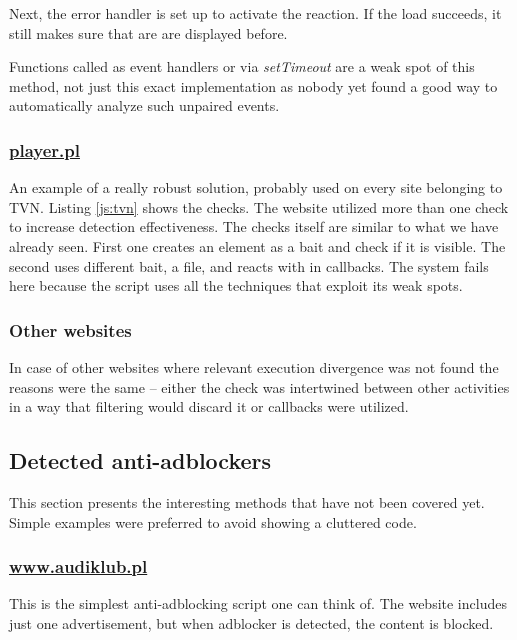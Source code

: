 Next, the error handler is set up to activate the reaction. If the load succeeds, it still
makes sure that are are displayed before.

Functions called as event handlers or via \emph{setTimeout} are a weak spot of this method,
not just this exact implementation as nobody yet found a good way to automatically
analyze such unpaired events.

\subsubsection{\url{player.pl}}
An example of a really robust solution, probably used on every site belonging to TVN.
Listing \ref{js:tvn} shows the checks. The website utilized more than one check
to increase detection effectiveness.
The checks itself are similar to what we have already seen. First one creates an element as a bait 
and check if it is visible. The second uses different bait, a file, and reacts with in callbacks.
The system fails here because the script uses all the techniques that exploit its weak spots.



\subsubsection{Other websites}
In case of other websites where relevant execution divergence was not found 
the reasons were the same -- either the check was intertwined between other activities
in a way that filtering would discard it or callbacks were utilized.

\subsection{Detected anti-adblockers}

This section presents the interesting methods that have not been covered yet.
Simple examples were preferred to avoid showing a cluttered code.

\subsubsection{\url{www.audiklub.pl}}
\label{audiklub}
This is the simplest anti-adblocking script one can think of. The website includes just one advertisement, 
but when adblocker
is detected, the content is blocked.

